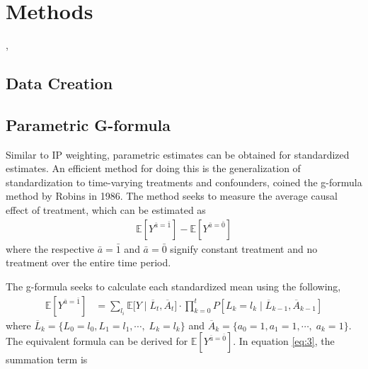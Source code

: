 
\chapter{Methods}

, 


\section{Data Creation} 



\section{Parametric G-formula} 
Similar to IP weighting, parametric estimates can be obtained for standardized estimates.  An efficient method for doing this is the generalization of standardization to time-varying treatments and confounders, coined the g-formula method by Robins in 1986.\cite{robins1986new, hernan_robins_2016}  The method seeks to measure the average causal effect of treatment, which can be estimated as 
\begin{align} 
\mathbb{E}[Y^{\bar{a} = \bar{1}}] - \mathbb{E}[Y^{\bar{a} = \bar{0}}] 
\end{align} 
where the respective $\bar{a} = \bar{1}$ and $\bar{a} = \bar{0}$ signify constant treatment and no treatment over the entire time period.  

The g-formula seeks to calculate each standardized mean using the following, 
\begin{align} \label{eq:3} 
\mathbb{E}[Y^{\bar{a}= \bar{1}}] &= \sum_{l_i} \mathbb{E} \big[Y \mid  \overline{L}_{t}, \overline{A}_{t} \big]\cdot \prod_{k=0}^t P[L_k = l_k \mid \overline{L}_{k-1}, \overline{A}_{k-1}]
\end{align}
where $\overline{L}_k = \{L_{0} = l_0, L_{1} = l_1,  \cdots, \; L_{k} = l_k\}$ and $\overline{A}_k = \{a_{0} = 1, a_{1} = 1,  \cdots, \; a_{k} = 1\}$.  The equivalent formula can be derived for $ \mathbb{E}[Y^{\bar{a} = \bar{0}}]$.   In equation \ref{eq:3}, the summation term is 


